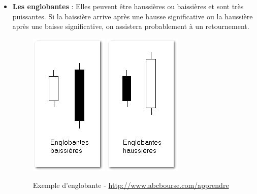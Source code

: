 \begin{itemize}
\item \textbf{Les englobantes} : Elles peuvent être haussières ou baissières et sont très puissantes. Si la baissière arrive après une hausse significative ou la haussière après une baisse significative, on assistera probablement à un retournement.
\begin{figure}[H]
  \center
  \includegraphics[scale=0.5]{../graph/chandelier5.png}
  \includegraphics[scale=0.5]{../graph/chandelier6.png}
  \caption{Exemple d'englobante - \url{http://www.abcbourse.com/apprendre}}
\end{figure} 


\end{itemize}
